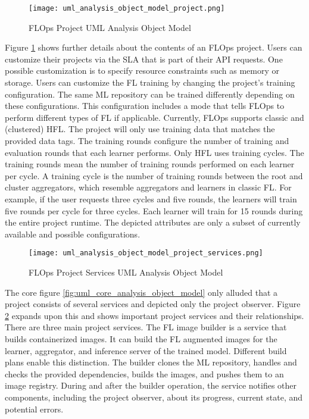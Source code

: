 \begin{figure}[h]
    \centering
    \texttt{[image: uml\_analysis\_object\_model\_project.png]}
    \caption{FLOps Project UML Analysis Object Model}
    \label{fig:uml_project_analysis_object_model}
\end{figure}

Figure \ref{fig:uml_project_analysis_object_model} shows further details about the contents of an FLOps project.
Users can customize their projects via the SLA that is part of their API requests.
One possible customization is to specify resource constraints such as memory or storage.
Users can customize the FL training by changing the project's training configuration.
The same ML repository can be trained differently depending on these configurations.
This configuration includes a mode that tells FLOps to perform different types of FL if applicable.
Currently, FLOps supports classic and (clustered) HFL.
The project will only use training data that matches the provided data tags.
The training rounds configure the number of training and evaluation rounds that each learner performs.
Only HFL uses training cycles.
The training rounds mean the number of training rounds performed on each learner per cycle.
A training cycle is the number of training rounds between the root and cluster aggregators, which resemble aggregators and learners in classic FL.
For example, if the user requests three cycles and five rounds, the learners will train five rounds per cycle for three cycles.
Each learner will train for 15 rounds during the entire project runtime.
The depicted attributes are only a subset of currently available and possible configurations.

\begin{figure}[h]
    \begin{adjustwidth}{-0.1\paperwidth}{-0.1\paperwidth}
        \centering
        \texttt{[image: uml\_analysis\_object\_model\_project\_services.png]}
        \caption{FLOps Project Services UML Analysis Object Model}
        \label{fig:uml_project_services_analysis_object_model}
    \end{adjustwidth}
\end{figure}

The core figure \ref{fig:uml_core_analysis_object_model} only alluded that a project consists of several services and depicted only the project observer.
Figure \ref{fig:uml_project_services_analysis_object_model} expands upon this and shows important project services and their relationships.
There are three main project services.
The FL image builder is a service that builds containerized images.
It can build the FL augmented images for the learner, aggregator, and inference server of the trained model.
Different build plans enable this distinction.
The builder clones the ML repository, handles and checks the provided dependencies, builds the images, and pushes them to an image registry.
During and after the builder operation, the service notifies other components, including the project observer, about its progress, current state, and potential errors.

